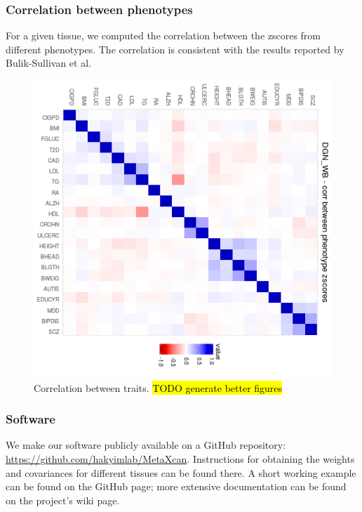 \documentclass[10pt]{article}
\begin{document}
\subsubsection*{Correlation between phenotypes}
For a given tissue, we computed the correlation between the zscores from different phenotypes. The correlation is consistent with the results reported by Bulik-Sullivan et al. 

\begin{figure}
\includegraphics[width=\textwidth]{plots/Fig9-corr-traits-DGN_WB.png}
\caption{Correlation between traits. \hl{TODO generate better figures}}
\label{fig:corr-traits}
\end{figure}




\subsubsection*{Software}

We make our software publicly available on a GitHub repository: \url{https://github.com/hakyimlab/MetaXcan}. Instructions for obtaining the weights and covariances for different tissues can be found there. A short working example can be found on the GitHub page; more extensive documentation can be found on the project's wiki page.
\end{document}
